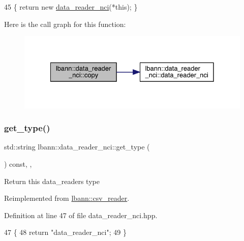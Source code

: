 \begin{DoxyCode}
45 \{ \textcolor{keywordflow}{return} \textcolor{keyword}{new} \hyperlink{classlbann_1_1data__reader__nci_a42a40564a0110df69b99832e520111e6}{data\_reader\_nci}(*\textcolor{keyword}{this}); \}
\end{DoxyCode}
Here is the call graph for this function\+:\nopagebreak
\begin{figure}[H]
\begin{center}
\leavevmode
\includegraphics[width=328pt]{classlbann_1_1data__reader__nci_a642f96edf3efae0d5d0aad70d8a17dbe_cgraph}
\end{center}
\end{figure}
\mbox{\label{classlbann_1_1data__reader__nci_a6709a3d1df162335fa4a6955ea7dcaa2}} 
\subsubsection{\texorpdfstring{get\+\_\+type()}{get\_type()}}
{\footnotesize\ttfamily std\+::string lbann\+::data\+\_\+reader\+\_\+nci\+::get\+\_\+type (\begin{DoxyParamCaption}{ }\end{DoxyParamCaption}) const\hspace{0.3cm}{\ttfamily [inline]}, {\ttfamily [override]}, {\ttfamily [virtual]}}

Return this data\+\_\+reader\textquotesingle{}s type 

Reimplemented from \hyperlink{classlbann_1_1csv__reader_a0ff6a8f07f69a0927ba0bac36ad31864}{lbann\+::csv\+\_\+reader}.



Definition at line 47 of file data\+\_\+reader\+\_\+nci.\+hpp.


\begin{DoxyCode}
47                                       \{
48     \textcolor{keywordflow}{return} \textcolor{stringliteral}{"data\_reader\_nci"};
49   \}
\end{DoxyCode}
\mbox{\label{classlbann_1_1data__reader__nci_aad2847ee20ec7f8d7d25c2ebfff1361e}} 
